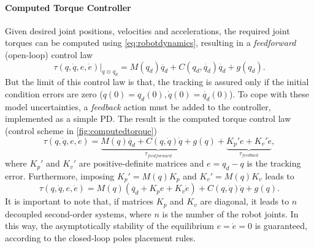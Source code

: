 \paragraph{Computed Torque Controller}
Given desired joint positions, velocities and accelerations, the required joint torques can be computed using \eqref{eq:robotdynamics}, resulting in a \textit{feedforward} (open-loop) control law
\begin{equation*}
\tau(q,\dot{q},e,\dot{e})\vert_{q \equiv q_d} = M(q_d)\ddot{q_d} + C(q_d,\dot{q_d})\dot{q_d} + g(q_d).
\end{equation*}
But the limit of this control law is that, the tracking is assured only if the initial condition errors are zero ($ q(0)=q_d(0),\dot{q}(0)=\dot{q_d}(0) $). To cope with these model uncertainties, a \textit{feedback} action must be added to the controller, implemented as a simple PD. The result is the computed torque control law (control scheme in \autoref{fig:computedtorque})
\begin{equation}
\tau(q,\dot{q},e,\dot{e}) = \underbrace{M(q)\ddot{q_d} + C(q,\dot{q})\dot{q} + g(q)}_{\tau_{feedforward}} + 
\underbrace{K_p'e + K_v'\dot{e}}_{\tau_{feedback}},
\end{equation}
where $ K_p' $ and $ K_v' $ are positive-definite matrices and $ e = q_d-q $ is the tracking error.
Furthermore, imposing $ K_p' = M(q)K_p $ and $ K_v' = M(q)K_v $ leads to
\begin{equation}
\tau(q,\dot{q},e,\dot{e}) = M(q)(\ddot{q_d} + K_{p}e + K_{v}\dot{e}) + C(q,\dot{q})\dot{q} + g(q).
\end{equation}
It is important to note that, if matrices $ K_p $ and $ K_v $ are diagonal, it leads to $ n $ decoupled second-order systems, where $ n $ is the number of the robot joints. In this way, the asymptotically stability of the equilibrium $ e = \dot{e} =0 $ is guaranteed, according to the closed-loop poles placement rules.


